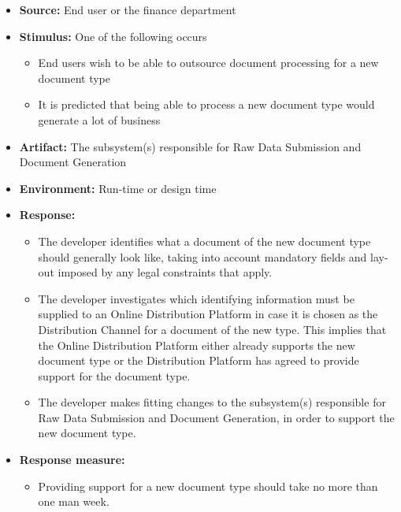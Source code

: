 \documentclass[a4paper,10pt]{article}
\begin{document}
\begin{itemize}
    \item \textbf{Source:} End user or the finance department
    \item \textbf{Stimulus:} One of the following occurs
        \begin{itemize}
            \item End users wish to be able to outsource document processing for a new document type
            \item It is predicted that being able to process a new document type would generate a lot of business
        \end{itemize}

    \item \textbf{Artifact:} The subsystem(s) responsible for Raw Data Submission and Document Generation
    \item \textbf{Environment:} Run-time or design time
    \item \textbf{Response:}
        \begin{itemize}
            \item The developer identifies what a document of the new document type should generally look like, taking into account mandatory fields and lay-out imposed by any legal constraints that apply.
            \item The developer investigates which identifying information must be supplied to an Online Distribution Platform in case it is chosen as the Distribution Channel for a document of the new type. This implies that the Online Distribution Platform either already supports the new document type or the Distribution Platform has agreed to provide support for the document type.
            \item The developer makes fitting changes to the subsystem(s) responsible for Raw Data Submission and Document Generation, in order to support the new document type.
        \end{itemize}

    \item \textbf{Response measure:}
        \begin{itemize}
            \item Providing support for a new document type should take no more than one man week.
        \end{itemize}
\end{itemize}
\end{document}
